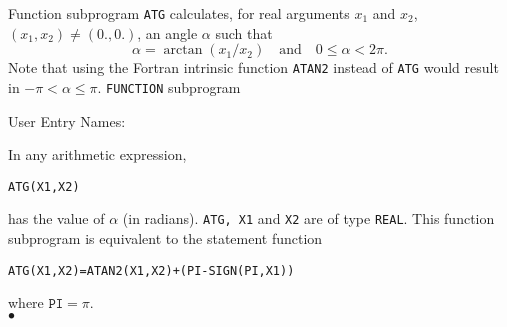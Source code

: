                  
         
\Submitter{}                   
             
Function subprogram {\tt ATG} calculates, for real arguments $x_1$ and
$x_2$, $(x_1,x_2) \neq (0.,0.)$, an angle $\alpha$ such that
$$\alpha =\arctan(x_1/x_2)\quad\mbox{and}\quad 0\leq\alpha<2\pi.$$
Note that using the Fortran intrinsic function {\tt ATAN2} instead of
{\tt ATG} would result in $-\pi<\alpha\leq\pi.$
\Structure
{\tt FUNCTION} subprogram
 
User Entry Names: 
 
\Usage
In any arithmetic expression,
\begin{center}
{\tt ATG(X1,X2)}
\end{center}
has the value of $\alpha$ (in radians).
{\tt ATG, X1} and {\tt X2} are of type {\tt REAL}.
\Notes
This function subprogram is equivalent to the statement function
\begin{center}
\tt ATG(X1,X2)=ATAN2(X1,X2)+(PI-SIGN(PI,X1))
\end{center}
where $\mathtt{PI = \displaystyle \pi}$.
\\ $\bullet$
